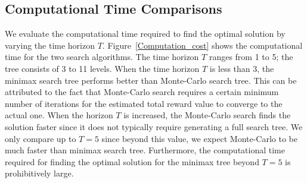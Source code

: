 \documentclass[10 pt, conference]{ieeeconf}
\newcommand{\PT}[1]{{\footnotesize\color{blue}[{\bf PT:} \textsf{#1}]}} %
\begin{document}


\subsection{Computational Time Comparisons}



We evaluate the computational time required to find the optimal solution by varying the time horizon $T$. Figure~\ref{Computation_cost} shows the computational time for the two search algorithms. The time horizon $T$ ranges from 1 to 5; the tree consists of 3 to 11 levels. When the time horizon $T$ is less than 3, the minimax search tree performs better than Monte-Carlo search tree. This can be attributed to the fact that Monte-Carlo search requires a certain minimum number of iterations for the estimated total reward value to converge to the actual one. When the horizon $T$ is increased, the Monte-Carlo search finds the solution faster since it does not typically require generating a full search tree. We only compare up to $T=5$ since beyond this value, we expect Monte-Carlo to be much faster than minimax search tree. Furthermore, the computational time required for finding the optimal solution for the minimax tree beyond $T=5$ is prohibitively large.

\begin{figure}[H]
\end{figure}
\end{document}
